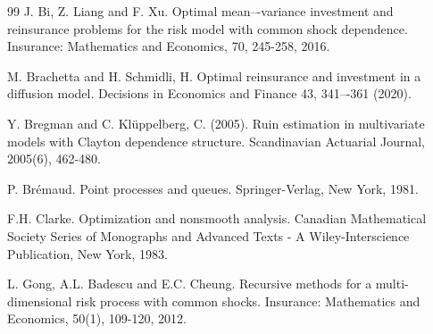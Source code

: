 \documentclass[reqno, 11pt]{amsart}%
\theoremstyle{definition}
\numberwithin{equation}{section} \numberwithin{theorem}{section}
\begin{document}
\begin{thebibliography}{99}
 J. Bi, Z. Liang and F. Xu. Optimal mean–-variance investment and reinsurance problems for the risk model with common shock dependence. Insurance: Mathematics and Economics, 70, 245-258, 2016.

 M. Brachetta and H. Schmidli, H. Optimal reinsurance and investment in a diffusion model. Decisions in Economics and Finance 43, 341–-361 (2020).


 Y. Bregman and C. Kl\"uppelberg, C. (2005). Ruin estimation in multivariate models with Clayton dependence structure. Scandinavian Actuarial Journal, 2005(6), 462-480.






 P. Br\'emaud. Point processes and queues. Springer-Verlag, New York, 1981.



 F.H. Clarke. Optimization and nonsmooth analysis. Canadian Mathematical Society Series of Monographs and Advanced Texts - A Wiley-Interscience Publication, New York, 1983.




 L. Gong, A.L. Badescu and E.C. Cheung. Recursive methods for a multi-dimensional risk process with common shocks. Insurance: Mathematics and Economics, 50(1), 109-120, 2012.






\end{thebibliography}
\end{document}
